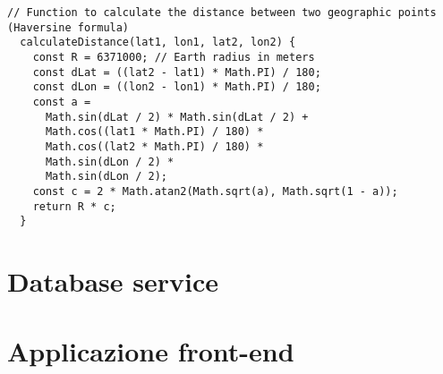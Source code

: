 \begin{lstlisting}[caption={Formual di Haversine in codice Javascript}, label=lst:haversine-formula-code]
  // Function to calculate the distance between two geographic points (Haversine formula)
  calculateDistance(lat1, lon1, lat2, lon2) {
    const R = 6371000; // Earth radius in meters
    const dLat = ((lat2 - lat1) * Math.PI) / 180;
    const dLon = ((lon2 - lon1) * Math.PI) / 180;
    const a =
      Math.sin(dLat / 2) * Math.sin(dLat / 2) +
      Math.cos((lat1 * Math.PI) / 180) *
      Math.cos((lat2 * Math.PI) / 180) *
      Math.sin(dLon / 2) *
      Math.sin(dLon / 2);
    const c = 2 * Math.atan2(Math.sqrt(a), Math.sqrt(1 - a));
    return R * c;
  }
\end{lstlisting}

\section{Database service}

\section{Applicazione front-end}